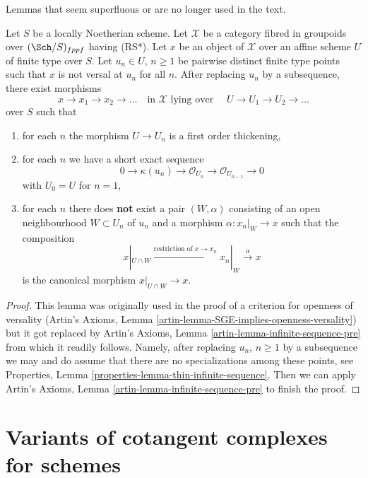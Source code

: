 \noindent
Lemmas that seem superfluous or are no longer used in the text.

\begin{lemma}
\label{lemma-infinite-sequence}
Let $S$ be a locally Noetherian scheme. Let $\mathcal{X}$ be a category
fibred in groupoids over $(\Sch/S)_{fppf}$ having (RS*).
Let $x$ be an object of
$\mathcal{X}$ over an affine scheme $U$ of finite type over $S$.
Let $u_n \in U$, $n \geq 1$ be pairwise distinct finite type points
such that $x$ is not versal at $u_n$ for all $n$. After replacing
$u_n$ by a subsequence, there exist morphisms
$$
x \to x_1 \to x_2 \to \ldots
\quad\text{in }\mathcal{X}\text{ lying over }\quad
U \to U_1 \to U_2 \to \ldots
$$
over $S$ such that
\begin{enumerate}
\item for each $n$ the morphism $U \to U_n$ is a first order
thickening,
\item for each $n$ we have a short exact sequence
$$
0 \to \kappa(u_n) \to \mathcal{O}_{U_n} \to \mathcal{O}_{U_{n - 1}} \to 0
$$
with $U_0 = U$ for $n = 1$,
\item for each $n$ there does {\bf not} exist a pair $(W, \alpha)$
consisting of an open neighbourhood $W \subset U_n$ of $u_n$
and a morphism $\alpha : x_n|_W \to x$
such that the composition
$$
x|_{U \cap W} \xrightarrow{\text{restriction of }x \to x_n}
x_n|_W \xrightarrow{\alpha} x
$$
is the canonical morphism $x|_{U \cap W} \to x$.
\end{enumerate}
\end{lemma}

\begin{proof}
This lemma was originally used in the proof of a criterion for
openness of versality
(Artin's Axioms, Lemma \ref{artin-lemma-SGE-implies-openness-versality}) but it
got replaced by Artin's Axioms, Lemma \ref{artin-lemma-infinite-sequence-pre}
from which it readily follows. Namely,
after replacing $u_n$, $n \geq 1$ by a subsequence we may and do
assume that there are no specializations among these points, see
Properties, Lemma \ref{properties-lemma-thin-infinite-sequence}.
Then we can apply
Artin's Axioms, Lemma \ref{artin-lemma-infinite-sequence-pre}
to finish the proof.
\end{proof}







\section{Variants of cotangent complexes for schemes}
\label{section-cotangent-schemes-variant}

